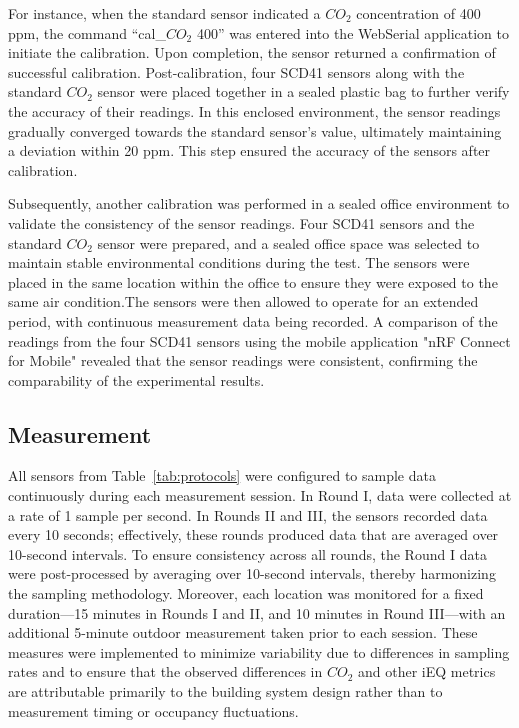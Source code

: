 \documentclass[preprint,12pt]{elsarticle}
\begin{document}
    For instance, when the standard sensor indicated a $CO_2$ concentration of 400 ppm\cite{29}, the command “cal\_$CO_2$ 400” was entered into the WebSerial application to initiate the calibration. Upon completion, the sensor returned a confirmation of successful calibration. Post-calibration, four SCD41 sensors along with the standard $CO_2$ sensor were placed together in a sealed plastic bag to further verify the accuracy of their readings. In this enclosed environment, the sensor readings gradually converged towards the standard sensor's value, ultimately maintaining a deviation within 20 ppm. This step ensured the accuracy of the sensors after calibration. 
    
    Subsequently, another calibration was performed in a sealed office environment to validate the consistency of the sensor readings. Four SCD41 sensors and the standard $CO_2$ sensor were prepared, and a sealed office space was selected to maintain stable environmental conditions during the test. The sensors were placed in the same location within the office to ensure they were exposed to the same air condition.The sensors were then allowed to operate for an extended period, with continuous measurement data being recorded. A comparison of the readings from the four SCD41 sensors using the mobile application "nRF Connect for Mobile" revealed that the sensor readings were consistent, confirming the comparability of the experimental results. 

\subsection{Measurement}
    
    All sensors from Table~\ref{tab:protocols} were configured to sample data continuously during each measurement session. In Round I, data were collected at a rate of 1 sample per second. In Rounds II and III, the sensors recorded data every 10 seconds; effectively, these rounds produced data that are averaged over 10-second intervals. To ensure consistency across all rounds, the Round I data were post-processed by averaging over 10-second intervals, thereby harmonizing the sampling methodology. Moreover, each location was monitored for a fixed duration—15 minutes in Rounds I and II, and 10 minutes in Round III—with an additional 5-minute outdoor measurement taken prior to each session. These measures were implemented to minimize variability due to differences in sampling rates and to ensure that the observed differences in $CO_2$ and other iEQ metrics are attributable primarily to the building system design rather than to measurement timing or occupancy fluctuations.
    
\end{document}
